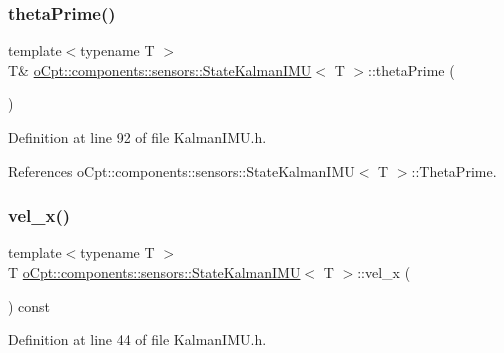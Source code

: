 \subsubsection{\texorpdfstring{theta\+Prime()}{thetaPrime()}\hspace{0.1cm}{\footnotesize\ttfamily [2/2]}}
{\footnotesize\ttfamily template$<$typename T $>$ \\
T\& \hyperlink{classo_cpt_1_1components_1_1sensors_1_1_state_kalman_i_m_u}{o\+Cpt\+::components\+::sensors\+::\+State\+Kalman\+I\+MU}$<$ T $>$\+::theta\+Prime (\begin{DoxyParamCaption}{ }\end{DoxyParamCaption})\hspace{0.3cm}{\ttfamily [inline]}}



Definition at line 92 of file Kalman\+I\+M\+U.\+h.



References o\+Cpt\+::components\+::sensors\+::\+State\+Kalman\+I\+M\+U$<$ T $>$\+::\+Theta\+Prime.

\hypertarget{classo_cpt_1_1components_1_1sensors_1_1_state_kalman_i_m_u_aa13bf50070ea8044635e336181778789}{}\label{classo_cpt_1_1components_1_1sensors_1_1_state_kalman_i_m_u_aa13bf50070ea8044635e336181778789} 
\subsubsection{\texorpdfstring{vel\+\_\+x()}{vel\_x()}\hspace{0.1cm}{\footnotesize\ttfamily [1/2]}}
{\footnotesize\ttfamily template$<$typename T $>$ \\
T \hyperlink{classo_cpt_1_1components_1_1sensors_1_1_state_kalman_i_m_u}{o\+Cpt\+::components\+::sensors\+::\+State\+Kalman\+I\+MU}$<$ T $>$\+::vel\+\_\+x (\begin{DoxyParamCaption}{ }\end{DoxyParamCaption}) const\hspace{0.3cm}{\ttfamily [inline]}}



Definition at line 44 of file Kalman\+I\+M\+U.\+h.



